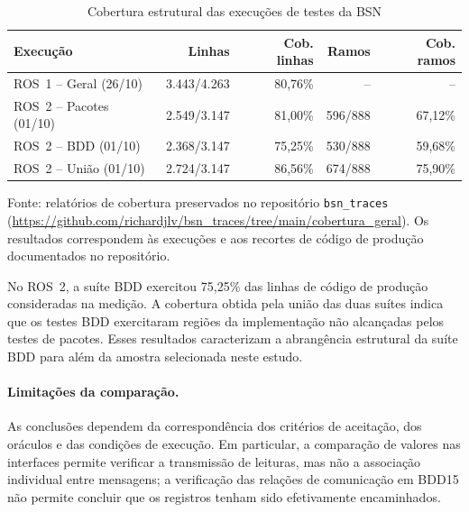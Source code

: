 \begin{table}[htbp]
\centering
\caption{Cobertura estrutural das execuções de testes da BSN}
\label{tab:rq2-cobertura}
\small
\begin{tabularx}{\textwidth}{@{}Xrrrr@{}}
\toprule
\textbf{Execução} &
\textbf{Linhas} &
\textbf{Cob. linhas} &
\textbf{Ramos} &
\textbf{Cob. ramos} \\
\midrule

ROS~1 -- Geral (26/10) &
3.443/4.263 & 80,76\% & -- & -- \\

ROS~2 -- Pacotes (01/10) &
2.549/3.147 & 81,00\% & 596/888 & 67,12\% \\

ROS~2 -- BDD (01/10) &
2.368/3.147 & 75,25\% & 530/888 & 59,68\% \\

ROS~2 -- União (01/10) &
2.724/3.147 & 86,56\% & 674/888 & 75,90\% \\

\bottomrule
\end{tabularx}

\par\smallskip
\begin{minipage}{\textwidth}
\footnotesize
Fonte: relatórios de cobertura preservados no repositório
\texttt{bsn\_traces}
(\url{https://github.com/richardjlv/bsn_traces/tree/main/cobertura_geral}).
Os resultados correspondem às execuções e aos recortes de código de produção documentados no repositório.
\end{minipage}
\end{table}

No ROS~2, a suíte BDD exercitou 75,25\% das linhas de código de produção consideradas na medição. A cobertura obtida pela união das duas suítes indica que os testes BDD exercitaram regiões da implementação não alcançadas pelos testes de pacotes. Esses resultados caracterizam a abrangência estrutural da suíte BDD para além da amostra selecionada neste estudo.


\paragraph{Limitações da comparação.}

As conclusões dependem da correspondência dos critérios de aceitação, dos oráculos e das condições de execução. Em particular, a comparação de valores nas interfaces permite verificar a transmissão de leituras, mas não a associação individual entre mensagens; a verificação das relações de comunicação em BDD15 não permite concluir que os registros tenham sido efetivamente encaminhados.

